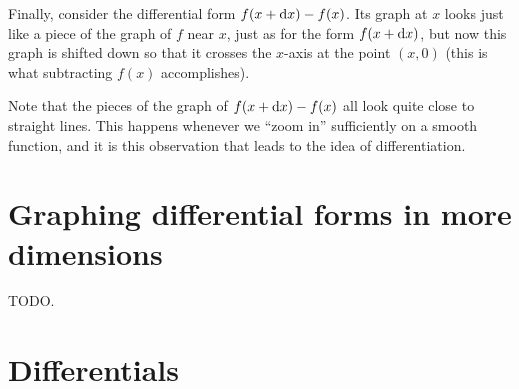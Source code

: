 \documentclass[12pt]{amsart}
\begin{document}
Finally, consider the differential form $f(x+{\mathrm{d} x})-f(x)$.
Its graph at $x$ looks just like a piece of the graph of $f$ near $x$, just as for the form $f(x+{\mathrm{d} x})$, but now this graph is shifted down so that it crosses the $x$-axis at the point $(x,0)$ (this is what subtracting $f(x)$ accomplishes).
\begin{center}
\end{center}
Note that the pieces of the graph of $f(x+{\mathrm{d} x})-f(x)$ all look quite close to straight lines.
This happens whenever we ``zoom in'' sufficiently on a smooth function, and it is this observation that leads to the idea of differentiation.

\section{Graphing differential forms in more dimensions}
\label{sec:graphing-higher-dim}

TODO.

\section{Differentials}
\label{sec:differentials}
\end{document}
